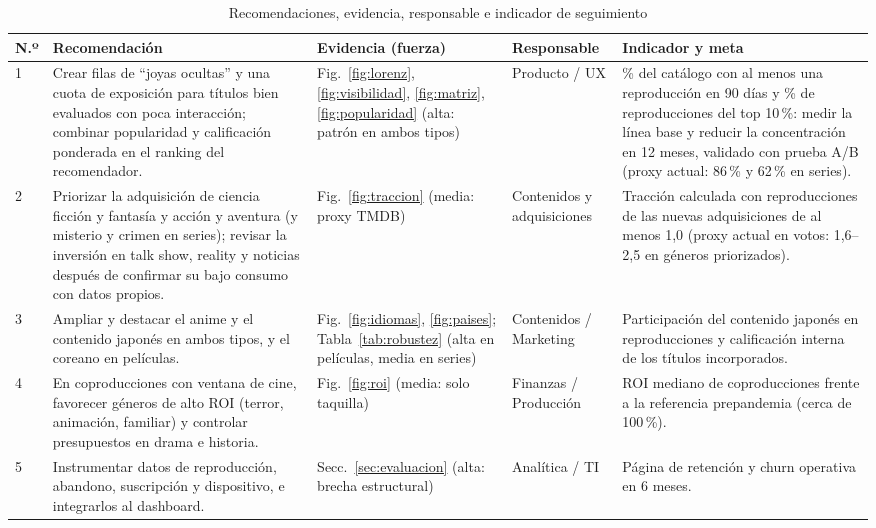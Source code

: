 \documentclass[conference,a4paper]{IEEEtran}
\begin{document}
\begin{table}[!t]
\caption{Recomendaciones, evidencia, responsable e indicador de seguimiento}
\label{tab:recomendaciones}
\centering\footnotesize
\begin{tabularx}{\textwidth}{@{}P{0.3cm}LP{2.6cm}P{1.9cm}P{5.0cm}@{}}
\toprule
N.º & Recomendación & Evidencia (fuerza) & Responsable & Indicador y meta\\
 & Crear filas de ``joyas ocultas'' y una cuota de exposición para títulos bien evaluados con poca interacción; combinar popularidad y calificación ponderada en el ranking del recomendador. & Fig.~\ref{fig:lorenz}, \ref{fig:visibilidad}, \ref{fig:matriz}, \ref{fig:popularidad} (alta: patrón en ambos tipos) & Producto / UX & \% del catálogo con al menos una reproducción en 90 días y \% de reproducciones del top 10\,\%: medir la línea base y reducir la concentración en 12 meses, validado con prueba A/B (proxy actual: 86\,\% y 62\,\% en series).\\
2 & Priorizar la adquisición de ciencia ficción y fantasía y acción y aventura (y misterio y crimen en series); revisar la inversión en talk show, reality y noticias después de confirmar su bajo consumo con datos propios. & Fig.~\ref{fig:traccion} (media: proxy TMDB) & Contenidos y adquisiciones & Tracción calculada con reproducciones de las nuevas adquisiciones de al menos 1,0 (proxy actual en votos: 1,6--2,5 en géneros priorizados).\\
3 & Ampliar y destacar el anime y el contenido japonés en ambos tipos, y el coreano en películas. & Fig.~\ref{fig:idiomas}, \ref{fig:paises}; Tabla~\ref{tab:robustez} (alta en películas, media en series) & Contenidos / Marketing & Participación del contenido japonés en reproducciones y calificación interna de los títulos incorporados.\\
4 & En coproducciones con ventana de cine, favorecer géneros de alto ROI (terror, animación, familiar) y controlar presupuestos en drama e historia. & Fig.~\ref{fig:roi} (media: solo taquilla) & Finanzas / Producción & ROI mediano de coproducciones frente a la referencia prepandemia (cerca de 100\,\%).\\
5 & Instrumentar datos de reproducción, abandono, suscripción y dispositivo, e integrarlos al dashboard. & Secc.~\ref{sec:evaluacion} (alta: brecha estructural) & Analítica / TI & Página de retención y churn operativa en 6 meses.\\
\bottomrule
\end{tabularx}
\end{table}
\end{document}
